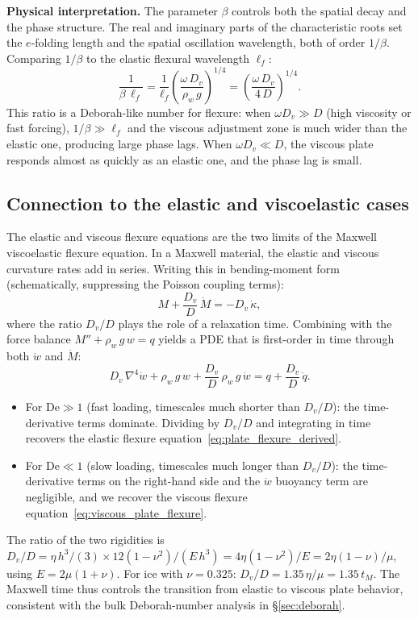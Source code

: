 \documentclass[11pt]{article}
\begin{document}
\medskip
\noindent\textbf{Physical interpretation.}  The parameter $\beta$ controls both the spatial decay and the phase structure.  The real and imaginary parts of the characteristic roots set the $e$-folding length and the spatial oscillation wavelength, both of order $1/\beta$.  Comparing $1/\beta$ to the elastic flexural wavelength $\ell_f$:
\begin{equation}
  \frac{1}{\beta\,\ell_f} = \frac{1}{\ell_f}\left(\frac{\omega\,D_v}{\rho_w\,g}\right)^{1/4} = \left(\frac{\omega\,D_v}{4\,D}\right)^{1/4}\!\!.
  \label{eq:beta_ell_ratio}
\end{equation}
This ratio is a Deborah-like number for flexure: when $\omega D_v \gg D$ (high viscosity or fast forcing), $1/\beta \gg \ell_f$ and the viscous adjustment zone is much wider than the elastic one, producing large phase lags.  When $\omega D_v \ll D$, the viscous plate responds almost as quickly as an elastic one, and the phase lag is small.

\subsection*{Connection to the elastic and viscoelastic cases}

The elastic and viscous flexure equations are the two limits of the Maxwell viscoelastic flexure equation.  In a Maxwell material, the elastic and viscous curvature rates add in series.  Writing this in bending-moment form (schematically, suppressing the Poisson coupling terms):
\begin{equation}
  M + \frac{D_v}{D}\,\dot{M} = -D_v\,\dot{\kappa},
  \label{eq:maxwell_moment}
\end{equation}
where the ratio $D_v/D$ plays the role of a relaxation time.  Combining with the force balance $M'' + \rho_w\,g\,w = q$ yields a PDE that is first-order in time through both $\dot{w}$ and $\dot{M}$:
\begin{equation}
  D_v\,\nabla^4 \dot{w} + \rho_w\,g\,w + \frac{D_v}{D}\,\rho_w\,g\,\dot{w} = q + \frac{D_v}{D}\,\dot{q}.
  \label{eq:viscoelastic_flexure}
\end{equation}
\begin{itemize}
  \item For $\text{De} \gg 1$ (fast loading, timescales much shorter than $D_v/D$): the time-derivative terms dominate.  Dividing by $D_v/D$ and integrating in time recovers the elastic flexure equation~\eqref{eq:plate_flexure_derived}.
  \item For $\text{De} \ll 1$ (slow loading, timescales much longer than $D_v/D$): the time-derivative terms on the right-hand side and the $\dot{w}$ buoyancy term are negligible, and we recover the viscous flexure equation~\eqref{eq:viscous_plate_flexure}.
\end{itemize}
The ratio of the two rigidities is $D_v / D = \eta\,h^3/(3) \times 12(1-\nu^2)/(E\,h^3) = 4\eta(1-\nu^2)/E = 2\eta(1-\nu)/\mu$, using $E = 2\mu(1+\nu)$.  For ice with $\nu = 0.325$: $D_v/D = 1.35\,\eta/\mu = 1.35\,t_M$.  The Maxwell time thus controls the transition from elastic to viscous plate behavior, consistent with the bulk Deborah-number analysis in \S\ref{sec:deborah}.
\end{document}
